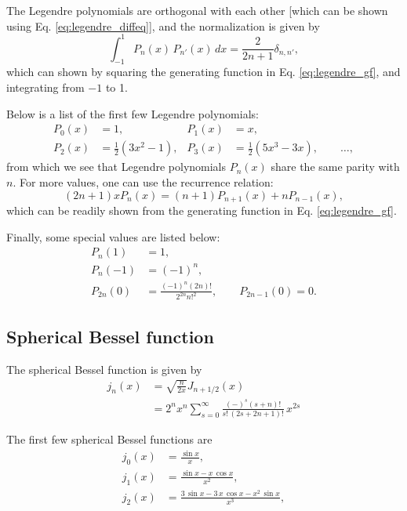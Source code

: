 \documentclass[11pt]{article}
\begin{document}
The Legendre polynomials are orthogonal with each other
[which can be shown using Eq. \eqref{eq:legendre_diffeq}],
and the normalization is given by
\begin{equation}
  \int_{-1}^1
  P_n(x) \, P_{n'}(x) \, dx
=
  \frac { 2 } { 2 n + 1} \delta_{n, n'},
  \label{eq:legendre_orthonormal}
\end{equation}
which can shown by squaring
the generating function in Eq. \eqref{eq:legendre_gf},
and integrating from $-1$ to 1.

Below is a list of the first few Legendre polynomials:
\begin{align*}
  P_0(x) &= 1, &
  P_1(x) &= x, \\
  P_2(x) &= \frac{1}{2}(3 x^2 - 1), &
  P_3(x) &= \frac{1}{2}(5 x^3 - 3 x),
  \qquad \dots,
\end{align*}
from which we see that
Legendre polynomials $P_n(x)$ share the same parity with $n$.
For more values, one can use the recurrence relation:
\begin{equation}
  (2 n + 1) x P_n(x) = (n + 1) P_{n+1}(x) + n P_{n-1}(x),
\end{equation}
which can be readily shown from the generating function in Eq. \eqref{eq:legendre_gf}.

Finally, some special values are listed below:
\begin{align}
  P_n(1)    &= 1,
  \label{eq:legendre_1} \\
  P_n(-1)   &= (-1)^n,
  \label{eq:legendre_neg1} \\
  P_{2n}(0) &= \frac{ (-1)^n (2n)! }{ 2^{2n} n!^2 },
  \qquad
  P_{2n-1}(0) = 0.
  \label{eq:legendre_0}
\end{align}



\subsection{Spherical Bessel function}



The spherical Bessel function is given by
\begin{align}
j_n(x)
&= \sqrt{ \frac{ n } { 2 x } } J_{n + 1/2}(x) \\
&= 2^n x^n
\sum_{s = 0}^\infty
\frac { (-)^s (s + n)! }
{ s! \, (2 s + 2 n + 1)! }
\,
x^{2s}
\label{eq:besselj}
\end{align}

The first few spherical Bessel functions are
\begin{align*}
  j_0(x) &= \frac { \sin x } { x }, \\
  j_1(x) &= \frac { \sin x - x \, \cos x } { x^2 }, \\
  j_2(x) &= \frac { 3 \, \sin x - 3 \, x \, \cos x - x^2 \, \sin x } { x^3 },
\end{align*}
\end{document}
